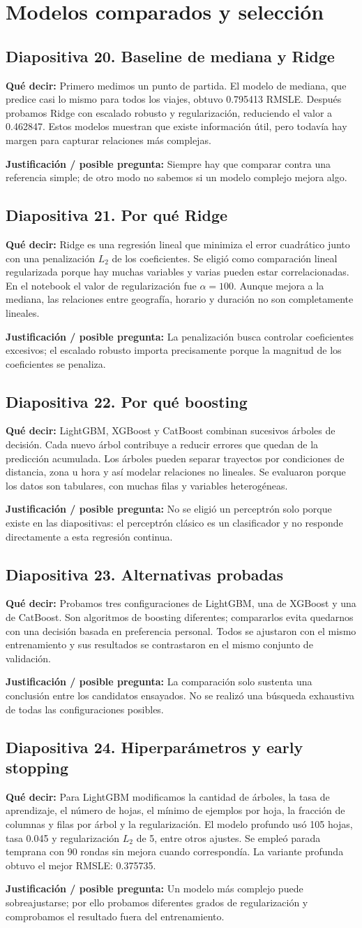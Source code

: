 \documentclass[11pt,letterpaper]{article}
\newcommand{\lamina}[2]{\subsection*{Diapositiva #1. #2}}
\newcommand{\explica}[1]{\noindent\textcolor{azul}{\textbf{Qué decir:}} #1\par\smallskip}
\newcommand{\defiende}[1]{\noindent\textcolor{verde}{\textbf{Justificación / posible pregunta:}} #1\par\medskip}
\begin{document}
\section{Modelos comparados y selección}
\lamina{20}{Baseline de mediana y Ridge}
\explica{Primero medimos un punto de partida. El modelo de mediana, que predice casi lo mismo para todos los viajes, obtuvo 0.795413 RMSLE. Después probamos Ridge con escalado robusto y regularización, reduciendo el valor a 0.462847. Estos modelos muestran que existe información útil, pero todavía hay margen para capturar relaciones más complejas.}
\defiende{Siempre hay que comparar contra una referencia simple; de otro modo no sabemos si un modelo complejo mejora algo.}

\lamina{21}{Por qué Ridge}
\explica{Ridge es una regresión lineal que minimiza el error cuadrático junto con una penalización $L_2$ de los coeficientes. Se eligió como comparación lineal regularizada porque hay muchas variables y varias pueden estar correlacionadas. En el notebook el valor de regularización fue $\alpha=100$. Aunque mejora a la mediana, las relaciones entre geografía, horario y duración no son completamente lineales.}
\defiende{La penalización busca controlar coeficientes excesivos; el escalado robusto importa precisamente porque la magnitud de los coeficientes se penaliza.}

\lamina{22}{Por qué boosting}
\explica{LightGBM, XGBoost y CatBoost combinan sucesivos árboles de decisión. Cada nuevo árbol contribuye a reducir errores que quedan de la predicción acumulada. Los árboles pueden separar trayectos por condiciones de distancia, zona u hora y así modelar relaciones no lineales. Se evaluaron porque los datos son tabulares, con muchas filas y variables heterogéneas.}
\defiende{No se eligió un perceptrón solo porque existe en las diapositivas: el perceptrón clásico es un clasificador y no responde directamente a esta regresión continua.}

\lamina{23}{Alternativas probadas}
\explica{Probamos tres configuraciones de LightGBM, una de XGBoost y una de CatBoost. Son algoritmos de boosting diferentes; compararlos evita quedarnos con una decisión basada en preferencia personal. Todos se ajustaron con el mismo entrenamiento y sus resultados se contrastaron en el mismo conjunto de validación.}
\defiende{La comparación solo sustenta una conclusión entre los candidatos ensayados. No se realizó una búsqueda exhaustiva de todas las configuraciones posibles.}

\lamina{24}{Hiperparámetros y early stopping}
\explica{Para LightGBM modificamos la cantidad de árboles, la tasa de aprendizaje, el número de hojas, el mínimo de ejemplos por hoja, la fracción de columnas y filas por árbol y la regularización. El modelo profundo usó 105 hojas, tasa 0.045 y regularización $L_2$ de 5, entre otros ajustes. Se empleó parada temprana con 90 rondas sin mejora cuando correspondía. La variante profunda obtuvo el mejor RMSLE: 0.375735.}
\defiende{Un modelo más complejo puede sobreajustarse; por ello probamos diferentes grados de regularización y comprobamos el resultado fuera del entrenamiento.}
\end{document}
